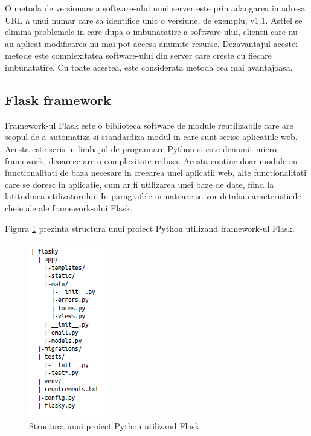 O metoda de versionare a software-ului unui server este prin adaugarea in adresa URL a unui numar care sa identifice unic o versiune, de exemplu, v1.1. 
Astfel se elimina problemele in care dupa o imbunatatire a software-ului, clientii care nu au aplicat modificarea nu mai pot accesa anumite resurse. 
Dezavantajul acestei metode este complexitatea software-ului din server care creste cu fiecare imbunatatire. Cu toate acestea, este considerata metoda 
cea mai avantajoasa.

\subsection{Flask framework}\label{sec:flask}
Framework-ul Flask este o biblioteca software de module reutilizabile care are scopul de a automatiza si standardiza modul in care sunt scrise aplicatiile 
web. Acesta este scris in limbajul de programare Python si este denumit micro-framework, deoarece are o complexitate redusa. Acesta contine doar module 
cu functionalitati de baza necesare in creearea unei aplicatii web, alte functionalitati care se doresc in aplicatie, cum ar fi utilizarea unei baze de 
date, fiind la latitudinea utilizatorului. In paragrafele urmatoare se vor detalia caracteristicile cheie ale ale framework-ului Flask.

Figura \ref{fig:FlaskProjectStructure} prezinta structura unui proiect Python utilizand framework-ul Flask.
\begin{figure}[H]
    \centering
    \includegraphics[scale=0.75]{figs/FlaskProjectStructure.png}
    \caption{Structura unui proiect Python utilizand Flask}
    \label{fig:FlaskProjectStructure}
\end{figure}

